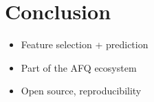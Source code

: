 \section*{Conclusion}

\begin{itemize}
  \item Feature selection + prediction
  \item Part of the AFQ ecosystem
  \item Open source, reproducibility
\end{itemize}
